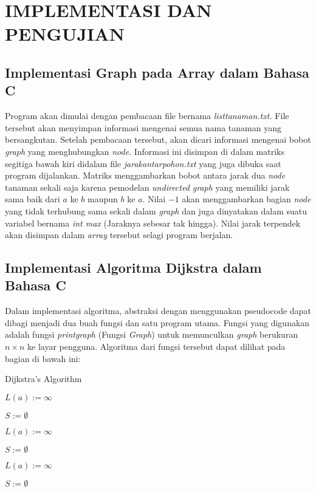 \documentclass[conference]{IEEEtran}
\begin{document}
\section{IMPLEMENTASI DAN PENGUJIAN}
\subsection{Implementasi Graph pada Array dalam Bahasa C}
    Program akan dimulai dengan pembacaan file bernama
    \textit{listtanaman.txt.} File tersebut akan menyimpan informasi mengenai
    semua nama tanaman yang bersangkutan. Setelah pembacaan
    tersebut, akan dicari informasi mengenai bobot \textit{graph}
    yang menghubungkan \textit{node}. Informasi ini disimpan di dalam
    matriks segitiga bawah kiri didalam file \textit{jarakantarpohon.txt}
    yang juga dibuka saat program dijalankan. Matriks menggambarkan
    bobot antara jarak dua \textit{node} tanaman sekali saja karena
    pemodelan \textit{undirected graph} yang memiliki jarak sama baik
    dari $a$ ke $b$ maupun $b$ ke $a$. Nilai $-1$ akan menggambarkan
    bagian \textit{node} yang tidak terhubung sama sekali dalam \textit{graph}
    dan juga dinyatakan dalam suatu variabel bernama \textit{int max}
    (Jaraknya sebesar tak hingga). Nilai jarak terpendek akan
    disimpan dalam \textit{array} tersebut selagi program berjalan.
\subsection{Implementasi Algoritma Dijkstra dalam Bahasa C}
    Dalam implementasi algoritma, abstraksi dengan menggunakan
    pseudocode dapat dibagi menjadi dua buah fungsi dan
    satu program utama. Fungsi yang digunakan adalah fungsi
    \textit{printgraph} (Fungsi \textit{Graph}) untuk memunculkan \textit{graph}
    berukuran $n \times n$ ke layar pengguna. Algoritma dari fungsi tersebut
    dapat dilihat pada bagian di bawah ini:

    \begin{algorithm}
        \caption{Dijkstra's Algorithm}\label{alg:two}

        

        $L(a) := \infty$

        $S := \emptyset$

        $L(a) := \infty$

        $S := \emptyset$

        $L(a) := \infty$

        $S := \emptyset$

        
    \end{algorithm}
    
\end{document}
